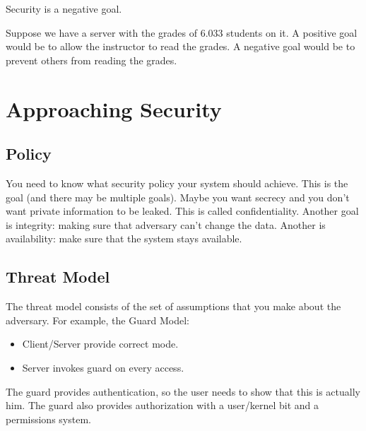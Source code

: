 \documentclass[psamsfonts]{amsart}
\begin{document}
Security is a negative goal.

Suppose we have a server with the grades of 6.033 students on it. A positive goal would be to allow the instructor to read the grades. A negative goal would be to prevent others from reading the grades.

\section{Approaching Security}

\subsection{Policy}

You need to know what security policy your system should achieve. This is the goal (and there may be multiple goals). Maybe you want secrecy and you don't want private information to be leaked. This is called confidentiality. Another goal is integrity: making sure that adversary can't change the data. Another is availability: make sure that the system stays available.

\subsection{Threat Model}

The threat model consists of the set of assumptions that you make about the adversary. For example, the Guard Model:

\begin{itemize}
  \item Client/Server provide correct mode.
  \item Server invokes guard on every access.
\end{itemize}

The guard provides authentication, so the user needs to show that this is actually him. The guard also provides authorization with a user/kernel bit and a permissions system.
\end{document}
